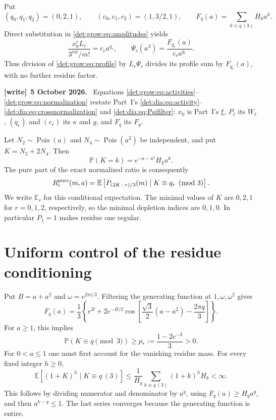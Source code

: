\documentclass[11pt,letterpaper]{article}
\numberwithin{equation}{section}
\theoremstyle{definition}\newtheorem{definition}[theorem]{Definition}
\theoremstyle{remark}\newtheorem{remark}[theorem]{Remark}
\newcommand{\E}{\mathbb E}
\newcommand{\Prb}{\mathbb P}
\DeclareMathOperator{\Pois}{Pois}
\newenvironment{writenote}[1][]{\par\smallskip\begingroup\small
 \noindent\textbf{[write]}\if\relax\detokenize{#1}\relax\else~\textbf{#1.}\fi\ }%
 {\par\endgroup\smallskip}
\begin{document}
Put
\begin{equation}\label{det:grow:eq:residues}
 (q_0,q_1,q_2)=(0,2,1),\qquad(c_0,c_1,c_2)=(1,3/2,1),\qquad
 F_q(a)=\sum_{k\equiv q\ (3)}H_k a^k.
\end{equation}
Direct substitution in \eqref{det:grow:eq:amplitudes} yields
\begin{equation}\label{det:grow:eq:normalization}
 \frac{x_0^rL_r}{3^{mt}/m!}=c_r a^{q_r},\qquad
 \Psi_r(a^3)=\frac{F_{q_r}(a)}{c_r a^{q_r}}.
\end{equation}
Thus division of \eqref{det:grow:eq:profile} by $L_r\Psi_r$ divides its profile
sum by $F_{q_r}(a)$, with no further residue factor.
\begin{writenote}[5 October 2026]
Equations \eqref{det:grow:eq:activities}--\eqref{det:grow:eq:normalization} restate Part~I's \eqref{det:dia:eq:activity}--\eqref{det:dia:eq:crossnormalization} and \eqref{det:dia:eq:Psifilter}: $x_0$ is Part~I's $\xi$, $P_\ell$ its $W_\ell$, $(q_r)$ and $(c_r)$ its $\kappa$ and $g$, and $F_q$ its $F_q$.
\end{writenote}

Let $N_2\sim\Pois(a)$ and $N_4\sim\Pois(a^2)$ be independent, and put
$K=N_2+2N_4$. Then
\[
 \Prb(K=k)=e^{-a-a^2}H_k a^k.
\]
The pure part of the exact normalized ratio is consequently
\begin{equation}\label{det:grow:eq:pure-exact}
 R_r^{\rm pure}(m,a)
 =\E\left[P_{(2K-r)/3}(m)\mid K\equiv q_r\pmod3\right].
\end{equation}
We write $\E_r$ for this conditional expectation. The minimal values of
$K$ are $0,2,1$ for $r=0,1,2$, respectively, so the minimal depletion
indices are $0,1,0$. In particular $P_1=1$ makes residue one regular.

\section{Uniform control of the residue conditioning}
Put $B=a+a^2$ and $\omega=e^{2\pi i/3}$. Filtering the generating
function at $1,\omega,\omega^2$ gives
\begin{equation}\label{det:grow:eq:filter}
 F_q(a)=\frac13\left\{e^B+2e^{-B/2}
 \cos\left[\frac{\sqrt3}{2}(a-a^2)-\frac{2\pi q}{3}\right]\right\}.
\end{equation}
For $a\ge1$, this implies
\begin{equation}\label{det:grow:eq:pstar}
 \Prb(K\equiv q\pmod3)\ge p_*:=\frac{1-2e^{-3}}3>0.
\end{equation}
For $0<a\le1$ one must first account for the vanishing residue mass.
For every fixed integer $h\ge0$,
\begin{equation}\label{det:grow:eq:smallmom}
 \E[(1+K)^h\mid K\equiv q\ (3)]
 \le\frac1{H_q}\sum_{k\equiv q\ (3)}(1+k)^hH_k<\infty.
\end{equation}
This follows by dividing numerator and denominator by $a^q$, using
$F_q(a)\ge H_q a^q$, and then $a^{k-q}\le1$. The last series converges
because the generating function is entire.
\end{document}
